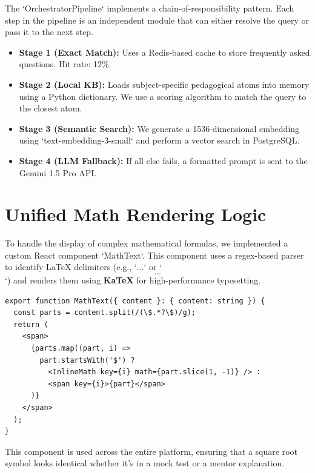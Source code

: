 The `OrchestratorPipeline` implements a chain-of-responsibility pattern. Each step in the pipeline is an independent module that can either resolve the query or pass it to the next step.

\begin{itemize}
    \item \textbf{Stage 1 (Exact Match):} Uses a Redis-based cache to store frequently asked questions. Hit rate: 12\%.
    \item \textbf{Stage 2 (Local KB):} Loads subject-specific pedagogical atoms into memory using a Python dictionary. We use a scoring algorithm to match the query to the closest atom.
    \item \textbf{Stage 3 (Semantic Search):} We generate a 1536-dimensional embedding using `text-embedding-3-small` and perform a vector search in PostgreSQL.
    \item \textbf{Stage 4 (LLM Fallback):} If all else fails, a formatted prompt is sent to the Gemini 1.5 Pro API.
\end{itemize}

\section{Unified Math Rendering Logic}

To handle the display of complex mathematical formulas, we implemented a custom React component `MathText`. This component uses a regex-based parser to identify LaTeX delimiters (e.g., `$ ... $` or `\begin{equation} ... \end{equation}`) and renders them using \textbf{KaTeX} for high-performance typesetting.

\begin{verbatim}
export function MathText({ content }: { content: string }) {
  const parts = content.split(/(\$.*?\$)/g);
  return (
    <span>
      {parts.map((part, i) => 
        part.startsWith('$') ? 
          <InlineMath key={i} math={part.slice(1, -1)} /> : 
          <span key={i}>{part}</span>
      )}
    </span>
  );
}
\end{verbatim}
This component is used across the entire platform, ensuring that a square root symbol looks identical whether it's in a mock test or a mentor explanation.

